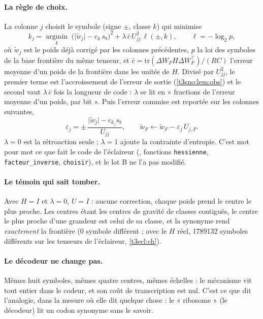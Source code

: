 \paragraph{La règle de choix.} La colonne $j$ choisit le symbole (signe $\pm$, classe $k$) qui minimise
\begin{equation}\label{t3sno:eq:choix}
k_j = \operatorname*{argmin}_{k}\; \bigl(\lvert \tilde w_j\rvert - c_k\, s_b\bigr)^2 + \lambda\, \bar c\, U_{jj}^2\, \ell(\pm, k),
\qquad \ell = -\log_2 p ,
\end{equation}
où $\tilde w_j$ est le poids déjà corrigé par les colonnes précédentes, $p$ la loi des symboles de la base frontière du même tenseur, et $\bar c = \mathrm{tr}(\Delta W_F H \Delta W_F^\top)/(RC)$ l'erreur moyenne d'un poids de la frontière dans les unités de $H$. Divisé par $U_{jj}^2$, le premier terme est l'accroissement de l'erreur de sortie (\cref{t3sno:lem:obs}) et le second vaut $\lambda\,\bar c$ fois la longueur de code : $\lambda$ se lit en « fractions de l'erreur moyenne d'un poids, par bit ». Puis l'erreur commise est reportée sur les colonnes suivantes,
\[
\varepsilon_j = \pm\,\frac{\lvert\tilde w_j\rvert - c_{k_j} s_b}{U_{jj}},
\qquad \tilde w_F \leftarrow \tilde w_F - \varepsilon_j\, U_{j,F} .
\]
$\lambda = 0$ est la rétroaction seule ; $\lambda = 1$ ajoute la contrainte d'entropie. C'est mot pour mot ce que fait le code de l'éclaireur (, fonctions \texttt{hessienne}, \texttt{facteur\_inverse}, \texttt{choisir}), et le lot B ne l'a pas modifié.

\paragraph{Le témoin qui sait tomber.} Avec $H = I$ et $\lambda = 0$, $U = I$ : aucune correction, chaque poids prend le centre le plus proche. Les centres étant les centres de gravité de classes contiguës, le centre le plus proche d'une grandeur est celui de sa classe, et la synonyme rend \emph{exactement} la frontière (0 symbole différent ; avec le $H$ réel, \num{1789132} symboles différents sur les tenseurs de l'éclaireur, \cref{t3ecl:ch}).

\paragraph{Le décodeur ne change pas.} Mêmes huit symboles, mêmes quatre centres, mêmes échelles : le mécanisme vit tout entier dans le codeur, et son coût de transcription est nul. C'est ce que dit l'analogie, dans la mesure où elle dit quelque chose : le « ribosome » (le décodeur) lit un codon synonyme sans le savoir.

